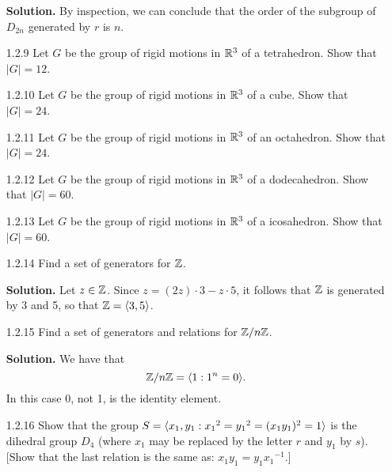 \begin{enumerate}
      \textbf{Solution.} By inspection, we can conclude that the order of the
      subgroup of $D_{2n}$ generated by $r$ is $n$.
   \item[1.2.9]   Let $G$ be the group of rigid motions in $\mathbb{R}^3$ of a
                  tetrahedron. Show that $|G| = 12$.
   \item[1.2.10]  Let $G$ be the group of rigid motions in $\mathbb{R}^3$ of a cube.
                  Show that $|G| = 24$.
   \item[1.2.11]  Let $G$ be the group of rigid motions in $\mathbb{R}^3$ of an
                  octahedron. Show that $|G| = 24$.
   \item[1.2.12]  Let $G$ be the group of rigid motions in $\mathbb{R}^3$ of a
                  dodecahedron. Show that $|G| = 60$.
   \item[1.2.13]  Let $G$ be the group of rigid motions in $\mathbb{R}^3$ of a
                  icosahedron. Show that $|G| = 60$.
   \item[1.2.14]  Find a set of generators for $\mathbb{Z}$.
   
      \textbf{Solution.} Let $z \in \mathbb{Z}$. Since $z = (2z) \cdot 3 - z \cdot 5$,
      it follows that $\mathbb{Z}$ is generated by 3 and 5, so that $\mathbb{Z} = \langle 3, 5 \rangle$.
   \item[1.2.15]  Find a set of generators and relations for $\mathbb{Z}/n\mathbb{Z}$.
   
      \textbf{Solution.} We have that
      $$\mathbb{Z}/n\mathbb{Z} = \langle 1 : 1^n = 0 \rangle.$$
      In this case 0, not 1, is the identity element.
   \item[1.2.16]  Show that the group $S =
                  \langle x_1, y_1 : {x_1}^2 = {y_1}^2 = (x_1y_1)^2 = 1 \rangle$ is the
                  dihedral group $D_4$ (where $x_1$ may be replaced by the
                  letter $r$ and $y_1$ by $s$). [Show that the last relation is
                  the same as: $x_1y_1 = y_1{x_1}^{-1}$.]


\end{enumerate}
